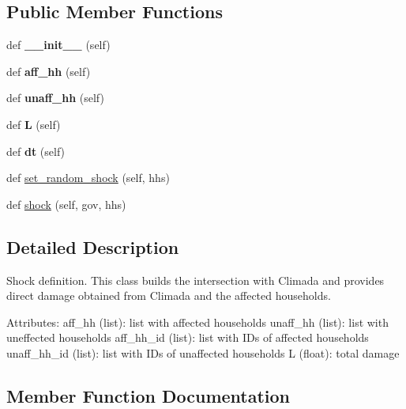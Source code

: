 \subsection*{Public Member Functions}
\begin{DoxyCompactItemize}
\item 
\mbox{\label{classshock_1_1Shock_a8329cfbad2da6ad2115358a1fb1eb285}} 
def {\bfseries \+\_\+\+\_\+init\+\_\+\+\_\+} (self)
\item 
\mbox{\label{classshock_1_1Shock_aeebc7c69f51fd5d99df7e54c5e00d1f8}} 
def {\bfseries aff\+\_\+hh} (self)
\item 
\mbox{\label{classshock_1_1Shock_a3f1238f3185a86b3bcbb0c6495a8d0d5}} 
def {\bfseries unaff\+\_\+hh} (self)
\item 
\mbox{\label{classshock_1_1Shock_a7db59427cbb975613758801593490a70}} 
def {\bfseries L} (self)
\item 
\mbox{\label{classshock_1_1Shock_a36753432928f5b31e8527338abad17d8}} 
def {\bfseries dt} (self)
\item 
def \hyperlink{classshock_1_1Shock_ae3e6312bb8b5bc7962d9180ed3f17aa3}{set\+\_\+random\+\_\+shock} (self, hhs)
\item 
def \hyperlink{classshock_1_1Shock_aefe691acc8ddd7e1c42a70e529ce192f}{shock} (self, gov, hhs)
\end{DoxyCompactItemize}


\subsection{Detailed Description}
\begin{DoxyVerb}Shock definition. This class builds the intersection with Climada and provides direct
   damage obtained from Climada and the affected households.

    Attributes:
        aff_hh (list): list with affected households
        unaff_hh (list): list with uneffected households
        aff_hh_id (list): list with IDs of affected households
        unaff_hh_id (list): list with IDs of unaffected households
        L (float): total damage
\end{DoxyVerb}
 

\subsection{Member Function Documentation}
\mbox{\label{classshock_1_1Shock_ae3e6312bb8b5bc7962d9180ed3f17aa3}} 
